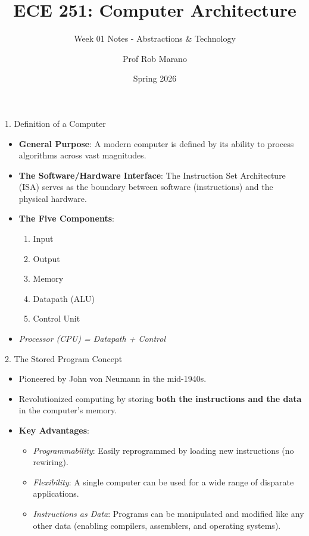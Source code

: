 \documentclass[aspectratio=169]{beamer}
\title{ECE 251: Computer Architecture}
\subtitle{Week 01 Notes - Abstractions \& Technology}
\author{Prof Rob Marano}
\date{Spring 2026}
\begin{document}
\frame{\titlepage}

\begin{frame}{1. Definition of a Computer}
\begin{itemize}
    \item \textbf{General Purpose}: A modern computer is defined by its ability to process algorithms across vast magnitudes.
    \item \textbf{The Software/Hardware Interface}: The Instruction Set Architecture (ISA) serves as the boundary between software (instructions) and the physical hardware.
    \item \textbf{The Five Components}:
    \begin{enumerate}
        \item Input
        \item Output
        \item Memory
        \item Datapath (ALU)
        \item Control Unit
    \end{enumerate}
    \item \textit{Processor (CPU) = Datapath + Control}
\end{itemize}
\end{frame}

\begin{frame}{2. The Stored Program Concept}
\begin{itemize}
    \item Pioneered by John von Neumann in the mid-1940s.
    \item Revolutionized computing by storing \textbf{both the instructions and the data} in the computer's memory.
    \item \textbf{Key Advantages}:
    \begin{itemize}
        \item \textit{Programmability}: Easily reprogrammed by loading new instructions (no rewiring).
        \item \textit{Flexibility}: A single computer can be used for a wide range of disparate applications.
        \item \textit{Instructions as Data}: Programs can be manipulated and modified like any other data (enabling compilers, assemblers, and operating systems).
    \end{itemize}
\end{itemize}
\end{frame}
\end{document}
